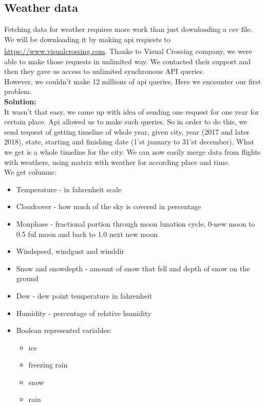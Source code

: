 \documentclass{article}
\begin{document}
	\subsection{Weather data}
		Fetching data for weather requires more work than just downloading a csv file.
		We will be downloading it by making api requests to \url{https://www.visualcrossing.com}.
		Thanks to Visual Crossing\textsuperscript{\tiny\textregistered} company, we were able to make those requests in unlimited way.
		We contacted their support and then they gave us access to unlimited synchronous API queries. 	\\
		However, we couldn't make 12 millions of api queries. Here we encounter
		our first problem.\\
		\textbf{Solution:}\\
		It wasn't that easy, we came up with idea of sending one request for one year for certain place.
		Api allowed us to make such queries.  So in order to do this, we send request of getting timeline of whole year,
		given city, year (2017 and later 2018), state, starting and finishing date (1'st january to 31'st december). What we get is a whole 					timeline
		for the city. We can now easily merge data from flights with weathers, using matrix with weather for 
		according place and time.\\

		We get columns:

			\begin{itemize}
\item Temperature - in fahrenheit scale
\item Cloudcover - how much of the sky is covered in percentage
\item Monphase - fractional portion through moon lunation cycle, 0-new moon to 0.5 ful moon and back to 1.0 next new moon
\item Windspeed, windgust and winddir
\item Snow and snowdepth - amount of snow that fell and depth of snow on the ground
\item Dew - dew point temperature in fahrenheit
\item Humidity - percentage of relative humidity
\item Boolean represented variables:
	\begin{itemize}
		\item ice
		\item freezing rain
		\item snow
		\item rain
	\end{itemize}
				
			\end{itemize}
\end{document}
